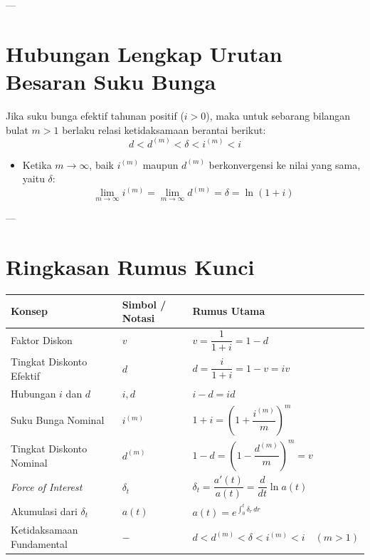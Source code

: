 \documentclass[11pt,a4paper]{article}
\begin{document}
---

\section{Hubungan Lengkap Urutan Besaran Suku Bunga}

Jika suku bunga efektif tahunan positif ($i > 0$), maka untuk sebarang bilangan bulat $m > 1$ berlaku relasi ketidaksamaan berantai berikut:
\begin{equation}
    d < d^{(m)} < \delta < i^{(m)} < i
\end{equation}
\begin{itemize}[leftmargin=1.5em]
    \item Ketika $m \to \infty$, baik $i^{(m)}$ maupun $d^{(m)}$ berkonvergensi ke nilai yang sama, yaitu $\delta$:
    \begin{equation*}
        \lim_{m \to \infty} i^{(m)} = \lim_{m \to \infty} d^{(m)} = \delta = \ln(1 + i)
    \end{equation*}
\end{itemize}

---

\section{Ringkasan Rumus Kunci}

\begin{center}
\renewcommand{\arraystretch}{1.5}
\begin{tabular}{lll}
\toprule
\textbf{Konsep} & \textbf{Simbol / Notasi} & \textbf{Rumus Utama} \\
\midrule
Faktor Diskon & $v$ & $v = \dfrac{1}{1+i} = 1 - d$ \\
Tingkat Diskonto Efektif & $d$ & $d = \dfrac{i}{1+i} = 1 - v = iv$ \\
Hubungan $i$ dan $d$ & $i, d$ & $i - d = id$ \\
Suku Bunga Nominal & $i^{(m)}$ & $1 + i = \left(1 + \dfrac{i^{(m)}}{m}\right)^m$ \\
Tingkat Diskonto Nominal & $d^{(m)}$ & $1 - d = \left(1 - \dfrac{d^{(m)}}{m}\right)^m = v$ \\
\textit{Force of Interest} & $\delta_t$ & $\delta_t = \dfrac{a'(t)}{a(t)} = \dfrac{d}{dt}\ln a(t)$ \\
Akumulasi dari $\delta_t$ & $a(t)$ & $a(t) = e^{\int_0^t \delta_r \, dr}$ \\
Ketidaksamaan Fundamental & $-$ & $d < d^{(m)} < \delta < i^{(m)} < i \quad (m > 1)$ \\
\bottomrule
\end{tabular}
\end{center}
\end{document}
